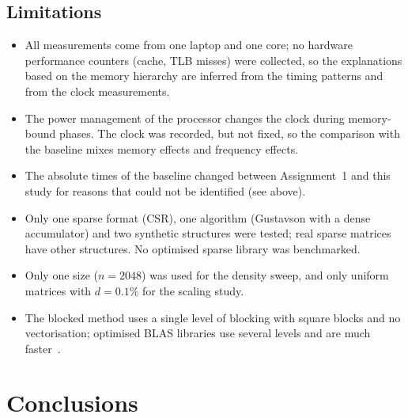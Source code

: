 \documentclass[12pt,a4paper]{report}
\begin{document}
\section{Limitations}

\begin{itemize}
  \item All measurements come from one laptop and one core; no hardware performance counters (cache, TLB misses) were
  collected, so the explanations based on the memory hierarchy are inferred from the timing patterns and from the
  clock measurements.
  \item The power management of the processor changes the clock during memory-bound phases. The clock was recorded,
  but not fixed, so the comparison with the baseline mixes memory effects and frequency effects.
  \item The absolute times of the baseline changed between Assignment~1 and this study for reasons that could not be
  identified (see above).
  \item Only one sparse format (CSR), one algorithm (Gustavson with a dense accumulator) and two synthetic structures
  were tested; real sparse matrices have other structures. No optimised sparse library was benchmarked.
  \item Only one size ($n = 2048$) was used for the density sweep, and only uniform matrices with $d = 0.1\%$ for the
  scaling study.
  \item The blocked method uses a single level of blocking with square blocks and no vectorisation; optimised BLAS
  libraries use several levels and are much faster~\cite{goto2008}.
\end{itemize}

\chapter{Conclusions}
\end{document}
